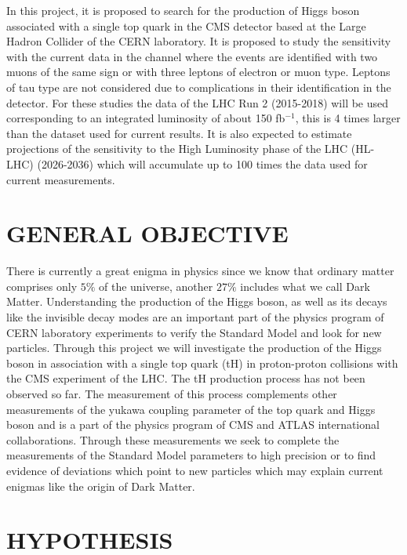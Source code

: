 \documentclass[final,3p]{CSP}
\begin{document}
In this project, it is proposed to search for the production of Higgs boson associated with a single top quark in the CMS detector based at the Large Hadron Collider of the CERN laboratory.
It is proposed to study the sensitivity with the current data in the channel where the events are identified with two muons of the same sign or with three leptons of electron or muon type.
Leptons of tau type are not considered due to complications in their identification in the detector.
For these studies the data of the LHC Run 2 (2015-2018) will be used corresponding to an integrated luminosity of about 150 fb$^{-1}$, this is 4 times larger than the dataset used for current results.
It is also expected to estimate projections of the sensitivity to the High Luminosity phase of the LHC (HL-LHC) (2026-2036) which will accumulate up to 100 times the data used for current measurements. 


\section{GENERAL OBJECTIVE}


There is currently a great enigma in physics since we know that ordinary matter comprises only $5\%$ of the universe, another  $27\%$ includes what we call Dark Matter.
Understanding the production of the Higgs boson, as well as its decays like the invisible decay modes are an important part of the physics program of CERN laboratory experiments to verify the Standard Model and look for new particles.
Through this project we will investigate the production of the Higgs boson in association with a single top quark (tH) in proton-proton collisions with the CMS experiment of the LHC.
The tH  production process has not been observed so far.
The measurement  of this process complements other measurements of the yukawa coupling parameter of the top  quark and Higgs boson and is a part of the physics program of CMS  and ATLAS international collaborations.
Through these measurements we seek to complete the measurements of the Standard Model parameters to high precision or to find evidence of deviations which point to new particles which may explain current enigmas like the origin of Dark Matter.


\section{HYPOTHESIS}
\end{document}
